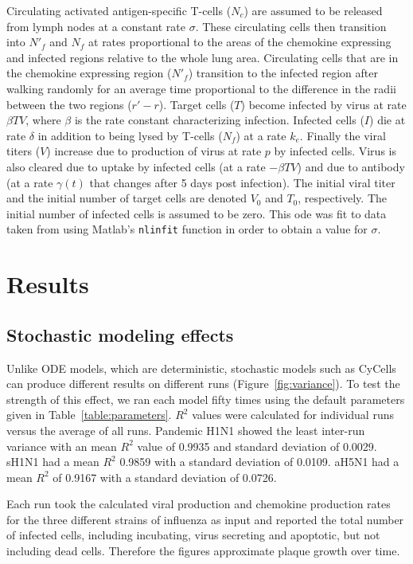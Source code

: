 \documentclass[10pt]{article}
\begin{document}
Circulating activated antigen-specific T-cells ($N_{c}$) are assumed to be released from lymph nodes at a constant rate $\sigma$. These circulating cells then transition into $N'_{f}$ and $N_{f}$ at rates proportional to the areas of the chemokine expressing and infected regions relative to the whole lung area. Circulating cells that are in the chemokine expressing region ($N'_{f}$) transition to the infected region after walking randomly for an average time proportional to the difference in the radii between the two regions ($r' - r$). Target cells ($T$) become infected by virus at rate $\beta TV$, where $\beta$ is the rate constant characterizing infection. Infected cells ($I$) die at rate $\delta$ in addition to being lysed by T-cells ($N_{f}$) at a rate $k_{e}$. Finally the viral titers ($V$) increase due to production of virus at rate $p$ by infected cells. Virus is also cleared due to uptake by infected cells (at a rate $- \beta TV$) and due to antibody (at a rate $\gamma (t)$ that changes after 5 days post infection). The initial viral titer and the initial number of target cells are denoted $V_{0}$ and $T_{0}$, respectively. The initial number of infected cells is assumed to be zero. This ode was fit to data taken from \cite{Miao2010} using Matlab's \texttt{nlinfit} function in order to obtain a value for $\sigma$.

\section{Results}

\subsection{Stochastic modeling effects}

Unlike ODE models, which are deterministic, stochastic models such as CyCells can produce different results on different runs (Figure~\ref{fig:variance}).  To test the strength of this effect, we ran each model fifty times using the default parameters given in Table~\ref{table:parameters}.  $R^2$ values were calculated for individual runs versus the average of all runs.  Pandemic H1N1 showed the least inter-run variance with an mean $R^2$ value of 0.9935 and standard deviation of 0.0029.  sH1N1 had a mean $R^2$ 0.9859 with a standard deviation of 0.0109.  aH5N1 had a mean $R^2$ of 0.9167 with a standard deviation of 0.0726.  

Each run took the calculated viral production and chemokine production rates for the three different strains of influenza as input and reported the total number of infected cells, including incubating, virus secreting and apoptotic, but not including dead cells.  Therefore the figures approximate plaque growth over time.
\end{document}
